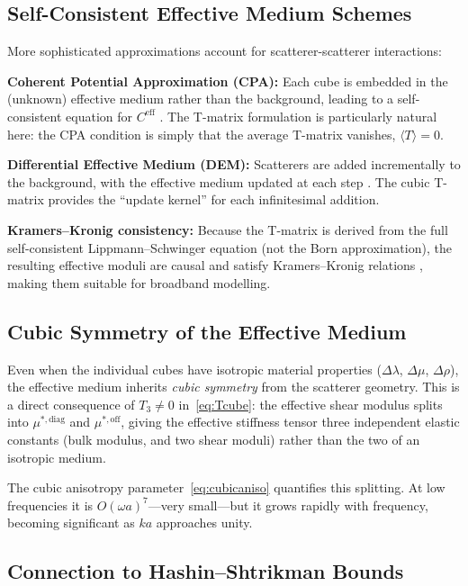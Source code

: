 \subsection{Self-Consistent Effective Medium Schemes}

More sophisticated approximations account for scatterer-scatterer
interactions:

\textbf{Coherent Potential Approximation (CPA):}  Each cube is embedded in
the (unknown) effective medium rather than the background, leading to a
self-consistent equation for $C^{\text{eff}}$ \citep{ZellerDederichs1973,Gubernatis1977}.
The T-matrix formulation is particularly natural here: the CPA condition
is simply that the average T-matrix vanishes, $\langle T\rangle = 0$.

\textbf{Differential Effective Medium (DEM):}  Scatterers are added
incrementally to the background, with the effective medium updated at each
step \citep{Norris1985}.  The cubic T-matrix provides the ``update kernel''
for each infinitesimal addition.

\textbf{Kramers--Kronig consistency:}  Because the T-matrix is derived
from the full self-consistent Lippmann--Schwinger equation (not the Born
approximation), the resulting effective moduli are causal and satisfy
Kramers--Kronig relations \citep{Willis1981}, making them suitable for
broadband modelling.

\subsection{Cubic Symmetry of the Effective Medium}

Even when the individual cubes have isotropic material properties
($\Delta\lambda$, $\Delta\mu$, $\Delta\rho$), the effective medium inherits
\emph{cubic symmetry} from the scatterer geometry.  This is a direct
consequence of $T_3\neq 0$ in~\eqref{eq:Tcube}: the effective shear
modulus splits into $\mu^{*,\text{diag}}$ and $\mu^{*,\text{off}}$, giving
the effective stiffness tensor three independent elastic constants (bulk
modulus, and two shear moduli) rather than the two of an isotropic medium.

The cubic anisotropy parameter~\eqref{eq:cubicaniso} quantifies this
splitting.  At low frequencies it is $O(\omega a)^7$---very small---but it
grows rapidly with frequency, becoming significant as $ka$ approaches unity.

\subsection{Connection to Hashin--Shtrikman Bounds}

